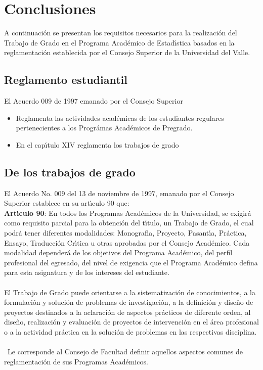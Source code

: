 \chapter{Conclusiones}

A continuaci\'{o}n se presentan los requisitos necesarios para la realizaci\'{o}n del Trabajo de Grado en el Programa Acad\'{e}mico de Estad\'{\i}stica basados en la reglamentaci\'{o}n establecida por el Consejo Superior de la Universidad del Valle.

\section{Reglamento estudiantil}

El Acuerdo 009 de 1997 emanado por el Consejo Superior
\begin{itemize}
\item Reglamenta las actividades acad\'{e}micas de los estudiantes regulares pertenecientes a los Progr\'{a}mas Acad\'{e}micos de Pregrado.

\item En el cap\'{\i}tulo XIV reglamenta los trabajos de grado
\end{itemize}

\section{De los trabajos de grado}

El Acuerdo No. 009 del 13 de noviembre de 1997, emanado por el Consejo Superior establece en su art\'{\i}culo 90 que:\\

\textbf{Art\'{\i}culo 90}: En todos los Programas Acad\'{e}micos de la Universidad,
se exigir\'{a} como requisito parcial para la obtenci\'{o}n del t\'{\i}tulo, un Trabajo de Grado, el cual podr\'{a} tener diferentes modalidades: Monograf\'{\i}a,
Proyecto, Pasant\'{\i}a, Pr\'{a}ctica, Ensayo, Traducci\'{o}n Cr\'{\i}tica u otras
aprobadas por el Consejo Acad\'{e}mico. Cada modalidad depender\'{a} de los objetivos del Programa Acad\'{e}mico, del perfil profesional del egresado, del nivel de exigencia que el Programa Acad\'{e}mico defina para esta asignatura y de los intereses del estudiante.\\\\ El Trabajo de Grado puede orientarse a la sistematizaci\'{o}n de conocimientos, a la formulaci\'{o}n y soluci\'{o}n de problemas de investigaci\'{o}n, a la definici\'{o}n y dise\~{n}o de proyectos destinados a la aclaraci\'{o}n de aspectos pr\'{a}cticos de diferente orden, al dise\~{n}o, realizaci\'{o}n y evaluaci\'{o}n de proyectos de intervenci\'{o}n en el \'{a}rea profesional o a la actividad pr\'{a}ctica en la soluci\'{o}n de problemas en las
respectivas disciplina.\\\\\
Le corresponde al Consejo de Facultad definir aquellos aspectos comunes de reglamentaci\'{o}n de sus Programas Acad\'{e}micos.\\


